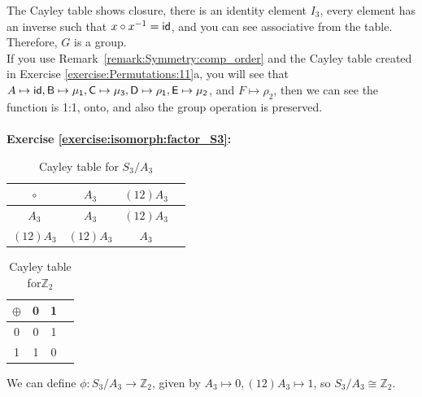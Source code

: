 \noindent
The Cayley table shows closure, there is an identity element $I_3$, every element has an inverse such that $x \circ x^{-1} = \sf{id}$, and you can see associative from the table. Therefore, $G$ is a group.  
\\
If you use Remark~\ref{remark:Symmetry:comp_order} and the Cayley table created in Exercise \ref{exercise:Permutations:11}a, you will see that $A \mapsto \sf{id}, B \mapsto \mu_1, C \mapsto \mu_3, D \mapsto \rho_1, E \mapsto \mu_2$, and $F \mapsto \rho_2$, then we can see the function is 1:1, onto, and also the group operation is preserved. 
\\
\\

\noindent\textbf{Exercise \ref{exercise:isomorph:factor_S3}:}
\begin{multicols}{2}
\begin{table}[H]
\caption{Cayley table for $S_3/A_3$}
{\small
\begin{center}
\begin{tabular}{c|ccc}
$\circ$ &$ A_3$ & $(12)A_3$  \\
\hline
$A_3$        &$A_3$ &$ (12)A_3$  \\
$(12)A_3$  & $(12)A_3$  &$A_3$   \\
\end{tabular}
\end{center}
}
\end{table}

\begin{table}[H]
\caption{Cayley table for${\mathbb Z}_2$}
{\small
\begin{center}
\begin{tabular}{c|ccc}
$\oplus$ & 0 & 1 \\

\hline
0 & 0 & 1 \\ 
1& 1 & 0 \\
\end{tabular}
\end{center}
}
\end{table}
\end{multicols}
\noindent We can define $\phi:S_3/A_3 \rightarrow {\mathbb Z}_2$,  given by  $A_3\mapsto 0,  (12)A_3 \mapsto 1$, so $S_3/A_3 \cong {\mathbb Z}_2$.
\\
\\

